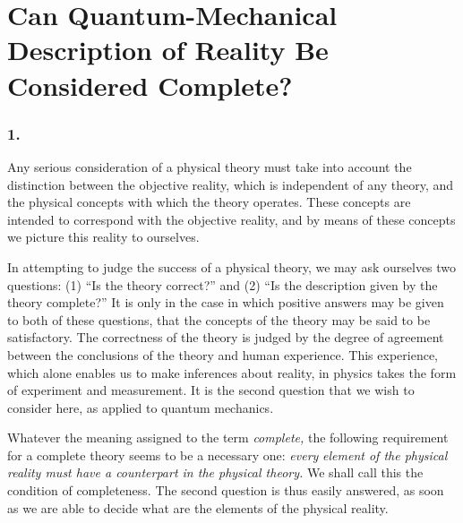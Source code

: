 \chapter{Can Quantum-Mechanical Description of Reality Be Considered Complete?\label{EPR}}



\renewcommand{\theequation}{\arabic{equation}}

\subsection*{1.}

Any serious consideration of a physical theory must take into account
the distinction between the objective reality, which is independent of
any theory, and the physical concepts with which the theory operates.
These concepts are intended to correspond with the objective reality,
and by means of these concepts we picture this reality to ourselves.

In attempting to judge the success of a physical theory, we may ask
ourselves two questions: (1) ``Is the theory correct?'' and (2) ``Is the
description given by the theory complete?'' It is only in the case in
which positive answers may be given to both of these questions, that the
concepts of the theory may be said to be satisfactory. The correctness
of the theory is judged by the degree of agreement between the
conclusions of the theory and human experience. This experience, which
alone enables us to make inferences about reality, in physics takes the
form of experiment and measurement. It is the second question that we
wish to consider here, as applied to quantum mechanics.

Whatever the meaning assigned to the term \emph{complete,} the following
requirement for a complete theory seems to be a necessary one:
\emph{every} \emph{element of the physical reality must have a
counterpart in the physical theory.} We shall call this the condition of
completeness. The second question is thus easily answered, as soon as we
are able to decide what are the elements of the physical reality.


